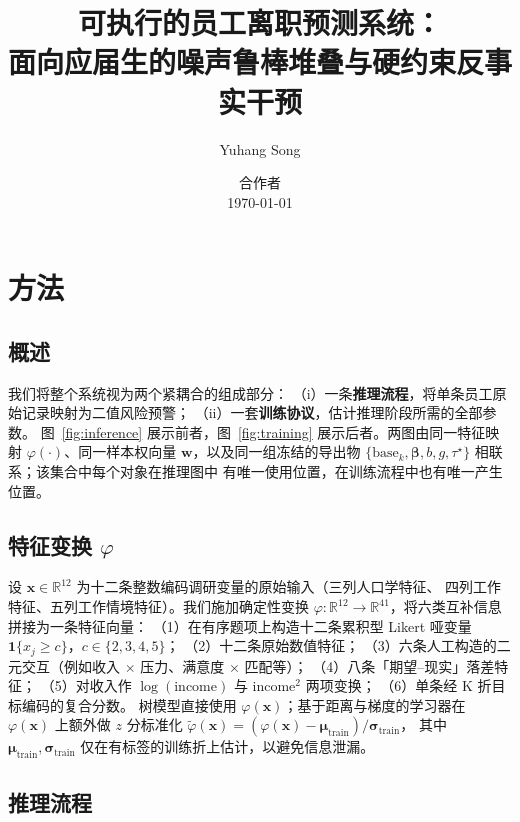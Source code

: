 \documentclass[UTF8,11pt,a4paper,fontset=ubuntu]{ctexart}
\title{可执行的员工离职预测系统：\\
面向应届生的噪声鲁棒堆叠与硬约束反事实干预}
\author{Yuhang Song \and 合作者 \\ \small{\today}}
\date{}
\newcommand{\RR}{\mathbb{R}}
\newcommand{\taustar}{\tau^{\star}}
\begin{document}
\maketitle

\section{方法}
\label{sec:methods}

\subsection{概述}
\label{sec:methods-overview}

我们将整个系统视为两个紧耦合的组成部分：
（i）一条\textbf{推理流程}，将单条员工原始记录映射为二值风险预警；
（ii）一套\textbf{训练协议}，估计推理阶段所需的全部参数。
图~\ref{fig:inference} 展示前者，图~\ref{fig:training} 展示后者。两图由同一特征映射
$\varphi(\cdot)$、同一样本权向量 $\mathbf{w}$，以及同一组冻结的导出物
$\{\text{base}_k,\bm{\beta},b,g,\taustar\}$ 相联系；该集合中每个对象在推理图中
有唯一使用位置，在训练流程中也有唯一产生位置。

\subsection{特征变换 \texorpdfstring{$\varphi$}{phi}}
\label{sec:methods-phi}

设 $\mathbf{x}\in\RR^{12}$ 为十二条整数编码调研变量的原始输入（三列人口学特征、
四列工作特征、五列工作情境特征）。我们施加确定性变换
$\varphi:\RR^{12}\to\RR^{41}$，将六类互补信息拼接为一条特征向量：
（1）在有序题项上构造十二条累积型 Likert 哑变量
$\mathbf{1}\{x_j\ge c\}$，$c\in\{2,3,4,5\}$；
（2）十二条原始数值特征；
（3）六条人工构造的二元交互（例如收入 $\times$ 压力、满意度 $\times$ 匹配等）；
（4）八条「期望--现实」落差特征；
（5）对收入作 $\log(\text{income})$ 与 $\text{income}^2$ 两项变换；
（6）单条经 K 折目标编码的复合分数。
树模型直接使用 $\varphi(\mathbf{x})$；基于距离与梯度的学习器在 $\varphi(\mathbf{x})$
上额外做 $z$ 分标准化
$\tilde{\varphi}(\mathbf{x}) = (\varphi(\mathbf{x}) - \bm{\mu}_{\mathrm{train}})/
\bm{\sigma}_{\mathrm{train}}$，
其中 $\bm{\mu}_{\mathrm{train}},\bm{\sigma}_{\mathrm{train}}$ 仅在有标签的训练折上估计，以避免信息泄漏。

\subsection{推理流程}
\label{sec:methods-inference}
\end{document}
